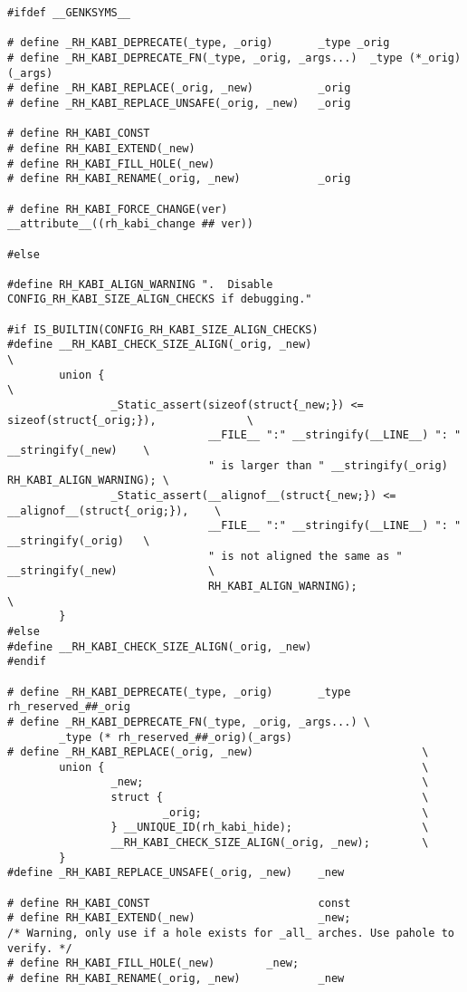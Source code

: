 \documentclass[10pt,oneside,english]{book}
\begin{document}
\begin{lstlisting}
#ifdef __GENKSYMS__

# define _RH_KABI_DEPRECATE(_type, _orig)       _type _orig
# define _RH_KABI_DEPRECATE_FN(_type, _orig, _args...)  _type (*_orig)(_args)
# define _RH_KABI_REPLACE(_orig, _new)          _orig
# define _RH_KABI_REPLACE_UNSAFE(_orig, _new)   _orig

# define RH_KABI_CONST
# define RH_KABI_EXTEND(_new)
# define RH_KABI_FILL_HOLE(_new)
# define RH_KABI_RENAME(_orig, _new)            _orig

# define RH_KABI_FORCE_CHANGE(ver)              __attribute__((rh_kabi_change ## ver))

#else

#define RH_KABI_ALIGN_WARNING ".  Disable CONFIG_RH_KABI_SIZE_ALIGN_CHECKS if debugging."

#if IS_BUILTIN(CONFIG_RH_KABI_SIZE_ALIGN_CHECKS)
#define __RH_KABI_CHECK_SIZE_ALIGN(_orig, _new)                                              \
        union {                                                                              \
                _Static_assert(sizeof(struct{_new;}) <= sizeof(struct{_orig;}),              \
                               __FILE__ ":" __stringify(__LINE__) ": "  __stringify(_new)    \
                               " is larger than " __stringify(_orig) RH_KABI_ALIGN_WARNING); \
                _Static_assert(__alignof__(struct{_new;}) <= __alignof__(struct{_orig;}),    \
                               __FILE__ ":" __stringify(__LINE__) ": "  __stringify(_orig)   \
                               " is not aligned the same as " __stringify(_new)              \
                               RH_KABI_ALIGN_WARNING);                                       \
        }
#else
#define __RH_KABI_CHECK_SIZE_ALIGN(_orig, _new)
#endif

# define _RH_KABI_DEPRECATE(_type, _orig)       _type rh_reserved_##_orig
# define _RH_KABI_DEPRECATE_FN(_type, _orig, _args...) \
        _type (* rh_reserved_##_orig)(_args)
# define _RH_KABI_REPLACE(_orig, _new)                          \
        union {                                                 \
                _new;                                           \
                struct {                                        \
                        _orig;                                  \
                } __UNIQUE_ID(rh_kabi_hide);                    \
                __RH_KABI_CHECK_SIZE_ALIGN(_orig, _new);        \
        }
#define _RH_KABI_REPLACE_UNSAFE(_orig, _new)    _new

# define RH_KABI_CONST                          const
# define RH_KABI_EXTEND(_new)                   _new;
/* Warning, only use if a hole exists for _all_ arches. Use pahole to verify. */
# define RH_KABI_FILL_HOLE(_new)        _new;
# define RH_KABI_RENAME(_orig, _new)            _new


\end{lstlisting}
\end{document}
